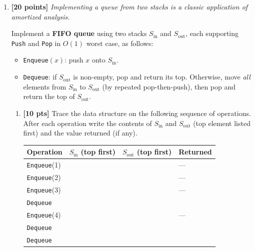 \documentclass[9pt]{book}
\begin{document}
\begin{enumerate}[label=\arabic*.]

\bigskip


\item \textbf{[20 points]} \textit{Implementing a queue from two stacks is a classic application of amortized analysis.}

Implement a \textbf{FIFO queue} using two stacks $S_{\text{in}}$ and $S_{\text{out}}$, each supporting \texttt{Push} and \texttt{Pop} in $O(1)$ worst case, as follows:
\begin{itemize}
    \item \texttt{Enqueue}$(x)$: push $x$ onto $S_{\text{in}}$.
    \item \texttt{Dequeue}: if $S_{\text{out}}$ is non-empty, pop and return its top.
    Otherwise, move \emph{all} elements from $S_{\text{in}}$ to $S_{\text{out}}$ (by repeated pop-then-push), then pop and return the top of $S_{\text{out}}$.
\end{itemize}

\begin{enumerate}[label=(\alph*)]
    \item \textbf{[10 pts]} Trace the data structure on the following sequence of operations.
    After each operation write the contents of $S_{\text{in}}$ and $S_{\text{out}}$ (top element listed first) and the value returned (if any).

    \medskip
    \begin{center}
    \begin{tabular}{l|l|l|l}
    \hline
    \textbf{Operation} & \textbf{$S_{\text{in}}$ (top first)} & \textbf{$S_{\text{out}}$ (top first)} & \textbf{Returned} \\
    \hline
    \texttt{Enqueue}(1) & & & --- \\[4pt]
    \texttt{Enqueue}(2) & & & --- \\[4pt]
    \texttt{Enqueue}(3) & & & --- \\[4pt]
    \texttt{Dequeue}    & & & \\[4pt]
    \texttt{Enqueue}(4) & & & --- \\[4pt]
    \texttt{Dequeue}    & & & \\[4pt]
    \texttt{Dequeue}    & & & \\[4pt]
    \hline
    \end{tabular}
    \end{center}


\end{enumerate}
\end{enumerate}
\end{document}
